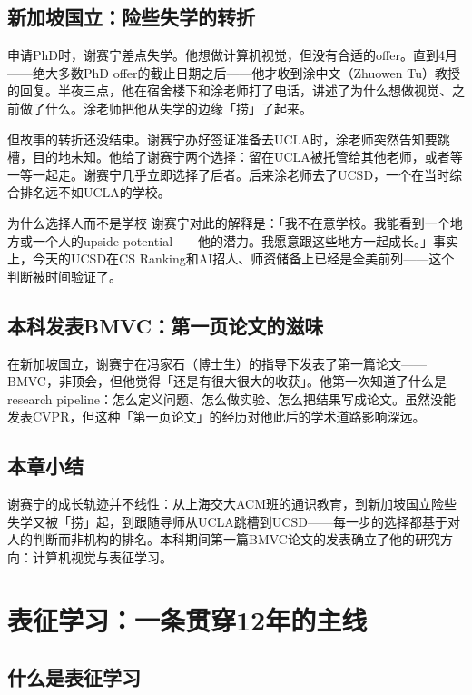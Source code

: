 \documentclass[a4paper]{article}
\begin{document}
\subsection{新加坡国立：险些失学的转折}

申请PhD时，谢赛宁差点失学。他想做计算机视觉，但没有合适的offer。直到4月——绝大多数PhD offer的截止日期之后——他才收到涂中文（Zhuowen Tu）教授的回复。半夜三点，他在宿舍楼下和涂老师打了电话，讲述了为什么想做视觉、之前做了什么。涂老师把他从失学的边缘「捞」了起来。

但故事的转折还没结束。谢赛宁办好签证准备去UCLA时，涂老师突然告知要跳槽，目的地未知。他给了谢赛宁两个选择：留在UCLA被托管给其他老师，或者等一等一起走。谢赛宁几乎立即选择了后者。后来涂老师去了UCSD，一个在当时综合排名远不如UCLA的学校。

\begin{knowledgebox}{为什么选择人而不是学校}
谢赛宁对此的解释是：「我不在意学校。我能看到一个地方或一个人的upside potential——他的潜力。我愿意跟这些地方一起成长。」事实上，今天的UCSD在CS Ranking和AI招人、师资储备上已经是全美前列——这个判断被时间验证了。
\end{knowledgebox}

\subsection{本科发表BMVC：第一页论文的滋味}

在新加坡国立，谢赛宁在冯家石（博士生）的指导下发表了第一篇论文——BMVC，非顶会，但他觉得「还是有很大很大的收获」。他第一次知道了什么是research pipeline：怎么定义问题、怎么做实验、怎么把结果写成论文。虽然没能发表CVPR，但这种「第一页论文」的经历对他此后的学术道路影响深远。

\subsection{本章小结}
谢赛宁的成长轨迹并不线性：从上海交大ACM班的通识教育，到新加坡国立险些失学又被「捞」起，到跟随导师从UCLA跳槽到UCSD——每一步的选择都基于对人的判断而非机构的排名。本科期间第一篇BMVC论文的发表确立了他的研究方向：计算机视觉与表征学习。

\section{表征学习：一条贯穿12年的主线}

\subsection{什么是表征学习}
\end{document}
